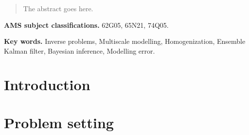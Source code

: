 \documentclass[10pt]{article}
\begin{document}
\maketitle	

\begin{abstract} The abstract goes here.
\end{abstract}	

\textbf{AMS subject classifications.} 62G05, 65N21, 74Q05.

\textbf{Key words.} Inverse problems, Multiscale modelling, Homogenization, Ensemble Kalman filter, Bayesian inference, Modelling error.

\section{Introduction}

\section{Problem setting}
\end{document}
